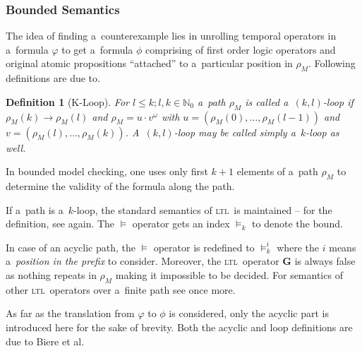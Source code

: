 \documentclass[12pt,oneside,draft]{fithesis}
\newcommand{\ltl}{\textsc{ltl}~}
\newcommand{\mNatural}{\mathbb{N}}
\newcommand{\bG}{\mathbf{G}}
\newtheorem{mydef}{Definition}
\begin{document}
\subsubsection*{Bounded Semantics}
The idea of finding a~counterexample lies in unrolling temporal
operators in a~formula $\varphi$ to get a~formula $\phi$ comprising
of first order logic operators and original atomic propositions
``attached'' to a~particular position in $\rho_M$. 
Following definitions are due to\cite{biere}.
\begin{mydef}[K-Loop]
For $l\leq k;l,k\in\mNatural_0$ a~path $\rho_M$ is called a~$(k,l)$-loop
if $\rho_M(k)\rightarrow\rho_M(l)$ and $\rho_M=u\cdot v^\omega$ with
$u=(\rho_M(0),\dotsc,\rho_M(l-1))$ and $v=(\rho_M(l),\dotsc,\rho_M(k))$.
A~$(k,l)$-loop may be called simply a~$k$-loop as well. 
\end{mydef}
In bounded model checking, one uses only first $k+1$ elements of
a~path $\rho_M$ to determine the validity of the formula along the
path\cite{biere}.

If a~path is a~$k$-loop, the standard semantics of \ltl is maintained --
for the definition, see again\cite{biere}. The $\models$ operator gets
an index $\models_k$ to denote the bound.

In case of an acyclic path, the $\models$ operator is redefined to
$\models_k^i$ where the $i$ means a~\emph{position in the prefix} to
consider. Moreover, the \ltl operator $\bG$ is always false as nothing
repeats in $\rho_M$ making it impossible to be decided. For semantics
of other \ltl operators over a~finite path see once more\cite{biere}.

As far as the translation from $\varphi$ to $\phi$ is considered,
only the acyclic part is introduced here for the
sake of brevity. Both the acyclic and loop definitions are due to
Biere et al\cite{biere}.
\end{document}
